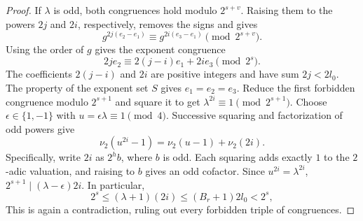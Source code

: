 \begin{proof}
If $\lambda$ is odd, both congruences hold modulo $2^{s+v}$. Raising them to the powers $2j$ and $2i$, respectively, removes the signs and gives
\[
 g^{2j(e_2-e_1)}\equiv g^{2i(e_3-e_1)}
 \pmod{2^{s+v}}.
\]
Using the order of $g$ gives the exponent congruence
\[
 2j e_2\equiv 2(j-i)e_1+2i e_3\pmod{2^s}.
\]
The coefficients $2(j-i)$ and $2i$ are positive integers and have sum $2j<2l_0$. The property of the exponent set $S$ gives $e_1=e_2=e_3$.
Reduce the first forbidden congruence modulo $2^{s+1}$ and square it to get $\lambda^{2i}\equiv1\pmod{2^{s+1}}$.
Choose $\epsilon\in\{1,-1\}$ with $u=\epsilon\lambda\equiv1\pmod4$. Successive squaring and factorization of odd powers give
\[
 \nu_2(u^{2i}-1)=\nu_2(u-1)+\nu_2(2i).
\]
Specifically, write $2i$ as $2^h b$, where $b$ is odd. Each squaring adds exactly $1$ to the $2$-adic valuation, and raising to $b$ gives an odd cofactor. Since $u^{2i}=\lambda^{2i}$,
$2^{s+1}\mid (\lambda-\epsilon)2i$. In particular,
\[
 2^s\le(\lambda+1)(2i)\le (B_r+1)2l_0<2^s,
\]
This is again a contradiction, ruling out every forbidden triple of congruences.
\end{proof}

